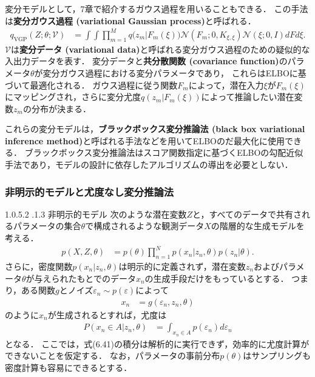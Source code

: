 \documentclass[11pt,a4paper]{jsarticle}
\makeatletter
\numberwithin{equation}{section}
\newcommand{\subsubsubsection}{\@startsection{paragraph}{4}{\z@}%
	{1.0\Cvs \@plus.5\Cdp \@minus.2\Cdp}%
	{.1\Cvs \@plus.3\Cdp}%
	{\reset@font\sffamily\normalsize}
}
\makeatother
\begin{document}
変分モデルとして，7章で紹介するガウス過程を用いることもできる．
この手法は\textbf{変分ガウス過程 (variational Gaussian process)}と呼ばれる．
\begin{align}
q_{\mathrm{VGP}}(Z; \theta; \mathcal{V})
& =
\int \int \prod_{m=1}^M q \bigl( z_m | F_m(\xi) \bigr)
\mathcal{N} (F_m; 0, K_{\xi, \xi}) \mathcal{N} (\xi; 0, I) dF d\xi.
\end{align}
$\mathcal{V}$は\textbf{変分データ (variational data)}と呼ばれる変分ガウス過程のための疑似的な入出力データを表す．
変分データと\textbf{共分散関数 (covariance function)}のパラメータ$\theta$が変分ガウス過程における変分パラメータであり，
これらはELBOに基づいて最適化される．
ガウス過程に従う関数$F_m$によって，潜在入力$\xi$が$F_m(\xi)$にマッピングされ，さらに変分尤度$q ( z_m | F_m(\xi) )$によって推論したい潜在変数$z_m$の分布が決まる．

これらの変分モデルは，\textbf{ブラックボックス変分推論法 (black box variational inference method)}と呼ばれる手法などを用いてELBOのだ最大化に使用できる．
ブラックボックス変分推論法はスコア関数指定に基づくELBOの勾配近似手法であり，モデルの設計に依存したアルゴリズムの導出を必要としない．

\subsubsection{非明示的モデルと尤度なし変分推論法}

\subsubsubsection{非明示的モデル}
次のような潜在変数$Z$と，すべてのデータで共有されるパラメータの集合$\theta$で構成されるような観測データ$X$の階層的な生成モデルを考える．
\begin{align}
p(X, Z, \theta)
& =
p(\theta) \prod_{n=1}^N p(x_n | z_n, \theta) p(z_n | \theta).
\end{align}
さらに，密度関数$p(x_n | z_n, \theta)$は明示的に定義されず，潜在変数$z_n$およびパラメータ$\theta$が与えられたもとでのデータ$x_n$の生成手段だけをもっているとする．
つまり，ある関数$g$とノイズ$\varepsilon_n \sim p(\varepsilon)$によって
\begin{align}
x_n
& =
g(\varepsilon_n, z_n, \theta)
\end{align}
のように$x_n$が生成されるとすれば，尤度は
\begin{align}
P(x_n \in A | z_n, \theta)
& =
\int_{x_n \in A} p(\varepsilon_n) d\varepsilon_n
\end{align}
となる．
ここでは，式(6.41)の積分は解析的に実行できず，効率的に尤度計算ができないことを仮定する．
なお，パラメータの事前分布$p(\theta)$はサンプリングも密度計算も容易にできるとする．
\end{document}
